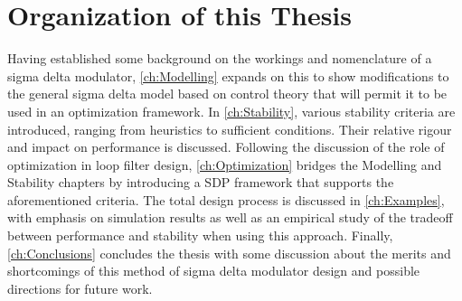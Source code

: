\section{Organization of this Thesis}
\label{sec:in-org}

Having established some background on the workings and nomenclature of a sigma delta modulator, \autoref{ch:Modelling} expands on this to show modifications to the general sigma delta model based on control theory that will permit it to be used in an optimization framework. In \autoref{ch:Stability}, various stability criteria are introduced, ranging from heuristics to sufficient conditions. Their relative rigour and impact on performance is discussed. Following the discussion of the role of optimization in loop filter design, \autoref{ch:Optimization} bridges the Modelling and Stability chapters by introducing a \gls{SDP} framework that supports the aforementioned criteria. The total design process is discussed in \autoref{ch:Examples}, with emphasis on simulation results as well as an empirical study of the tradeoff between performance and stability when using this approach. Finally, \autoref{ch:Conclusions} concludes the thesis with some discussion about the merits and shortcomings of this method of sigma delta modulator design and possible directions for future work.

\endinput
